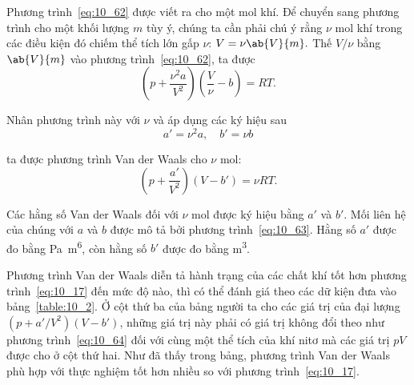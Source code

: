 Phương trình~\eqref{eq:10_62} được viết ra cho một mol khí. Để chuyển sang phương trình cho một khối lượng $m$ tùy ý, chúng ta cần phải chú ý rằng $\nu$ mol khí trong các điều kiện đó chiếm thể tích lớn gấp $\nu$: $V=\nu\ab{V}{m}.$ Thế $V/\nu$ bằng $\ab{V}{m}$ vào phương trình~\eqref{eq:10_62}, ta được   
\begin{equation*}
	\left(p + \frac{\nu^2 a}{V^2}\right) \left(\frac{V}{\nu} - b\right) = RT.
\end{equation*}

\noindent

Nhân phương trình này với $\nu$ và áp dụng các ký hiệu sau 
\begin{equation}\label{eq:10_63}
	a' = \nu^2 a,\quad b' = \nu b
\end{equation}

\noindent

ta được phương trình Van der Waals cho $\nu$ mol:
\begin{equation}\label{eq:10_64}
	\left(p + \frac{a'}{V^2}\right) (V - b') = \nu RT.
\end{equation}

\noindent

Các hằng số Van der Waals đối với $\nu$ mol được ký hiệu bằng $a'$ và $b'$. Mối liên hệ của chúng với $a$ và $b$ được mô tả bởi phương trình~\eqref{eq:10_63}. Hằng số $a'$ được đo bằng \si{\pascal~\metre^6}, còn hằng số $b'$ được đo bằng \si{\metre\cubed}.      


Phương trình Van der Waals diễn tả hành trạng của các chất khí tốt hơn phương trình~\eqref{eq:10_17} đến mức độ nào, thì có thể đánh giá theo các dữ kiện đưa vào bảng~\ref{table:10_2}. Ở cột thứ ba của bảng người ta cho các giá trị của đại lượng $(p+a'/V^2)(V-b')$, những giá trị này phải có giá trị không đổi theo như phương trình~\eqref{eq:10_64} đối với cùng một thể tích của khí nitơ mà các giá trị $pV$ được cho ở cột thứ hai. Như đã thấy trong bảng, phương trình Van der Waals phù hợp với thực nghiệm tốt hơn nhiều so với phương trình~\eqref{eq:10_17}. 

